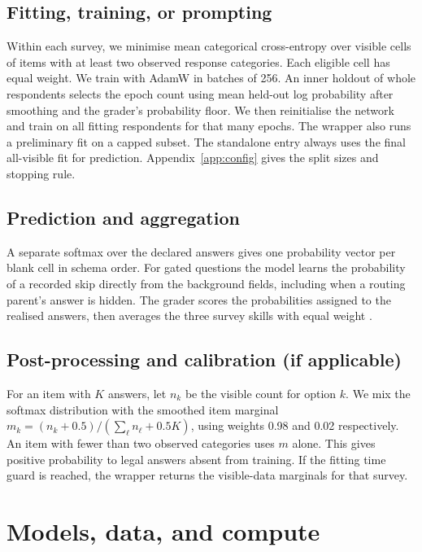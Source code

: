 \documentclass{article}
\begin{document}
\subsection{Fitting, training, or prompting}
Within each survey, we minimise mean categorical cross-entropy over visible cells of items with at least two observed response categories. Each eligible cell has equal weight. We train with AdamW in batches of 256. An inner holdout of whole respondents selects the epoch count using mean held-out log probability after smoothing and the grader's probability floor. We then reinitialise the network and train on all fitting respondents for that many epochs. The wrapper also runs a preliminary fit on a capped subset. The standalone entry always uses the final all-visible fit for prediction. Appendix~\ref{app:config} gives the split sizes and stopping rule.

\subsection{Prediction and aggregation}
A separate softmax over the declared answers gives one probability vector per blank cell in schema order. For gated questions the model learns the probability of a recorded skip directly from the background fields, including when a routing parent's answer is hidden. The grader scores the probabilities assigned to the realised answers, then averages the three survey skills with equal weight \citep{grader}.

\subsection{Post-processing and calibration (if applicable)}
For an item with $K$ answers, let $n_k$ be the visible count for option $k$. We mix the softmax distribution with the smoothed item marginal $m_k=(n_k+0.5)/(\sum_\ell n_\ell+0.5K)$, using weights 0.98 and 0.02 respectively. An item with fewer than two observed categories uses $m$ alone. This gives positive probability to legal answers absent from training. If the fitting time guard is reached, the wrapper returns the visible-data marginals for that survey.

\clearpage
\section{Models, data, and compute}
\end{document}
